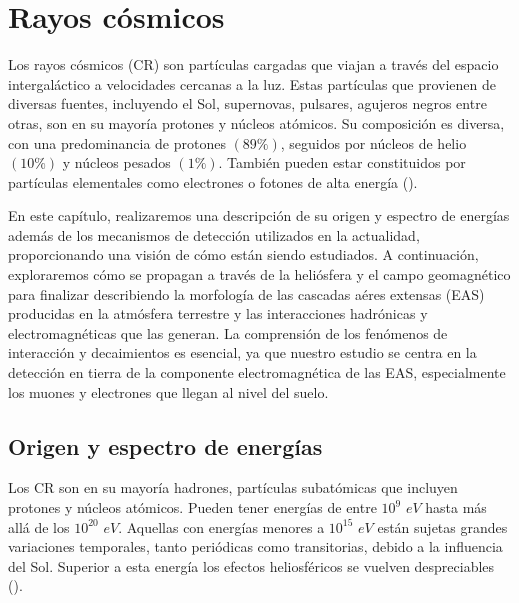 \newpage
\chapter{Rayos cósmicos}
Los rayos cósmicos (CR) son partículas cargadas que viajan a través del espacio intergaláctico a velocidades cercanas a la luz. Estas partículas que provienen de diversas fuentes, incluyendo el Sol, supernovas, pulsares, agujeros negros entre otras, son en su mayoría protones y núcleos atómicos. Su composición es diversa, con una predominancia de protones $(89\%)$, seguidos por núcleos de helio $( 10\%)$ y núcleos pesados $( 1\%)$. También pueden estar constituidos por partículas elementales como electrones o fotones de alta energía  (\cite{kampert_2012}). 

En este capítulo, realizaremos una descripción de su origen y espectro de energías además de los mecanismos de detección utilizados en la actualidad, proporcionando una visión de cómo están siendo estudiados.  A continuación, exploraremos cómo se propagan a través de la heliósfera y el campo geomagnético para finalizar describiendo la morfología de las cascadas aéres extensas (EAS) producidas en la atmósfera terrestre y las interacciones hadrónicas y electromagnéticas que las generan. La comprensión de los fenómenos de interacción y decaimientos es esencial, ya que nuestro estudio se centra en la detección en tierra de la componente electromagnética de las EAS, especialmente los muones y electrones que llegan al nivel del suelo. 

\section{Origen y espectro de energías}

Los CR son en su mayoría hadrones, partículas subatómicas que incluyen protones y núcleos atómicos. Pueden tener energías de entre $10^{9}$ $eV$ hasta más allá de los $10^{20}$ $eV$. Aquellas con energías menores a $10^{15}$ $eV$ están sujetas grandes variaciones temporales, tanto periódicas como transitorias, debido a la influencia del Sol. Superior a esta energía los efectos heliosféricos se vuelven despreciables (\cite{spurio_2015}).

